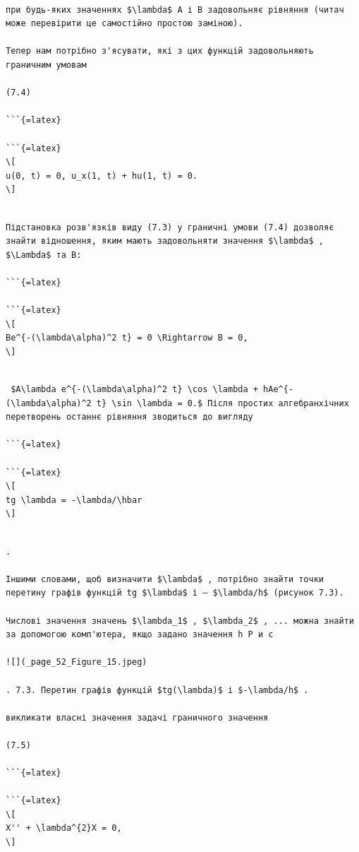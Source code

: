 \documentclass[
]{article}
\begin{document}
\begin{verbatim}

при будь-яких значеннях $\lambda$ A і B задовольняє рівняння (читач може перевірити це самостійно простою заміною).

Тепер нам потрібно з'ясувати, які з цих функцій задовольняють граничним умовам

(7.4)

```{=latex}

```{=latex}
\[
u(0, t) = 0, u_x(1, t) + hu(1, t) = 0.
\]
\end{verbatim}

\begin{verbatim}

Підстановка розв'язків виду (7.3) у граничні умови (7.4) дозволяє знайти відношення, яким мають задовольняти значення $\lambda$ , $\Lambda$ та B:

```{=latex}

```{=latex}
\[
Be^{-(\lambda\alpha)^2 t} = 0 \Rightarrow B = 0,
\]
\end{verbatim}

\begin{verbatim}

 $A\lambda e^{-(\lambda\alpha)^2 t} \cos \lambda + hAe^{-(\lambda\alpha)^2 t} \sin \lambda = 0.$ Після простих алгебранхічних перетворень останнє рівняння зводиться до вигляду

```{=latex}

```{=latex}
\[
tg \lambda = -\lambda/\hbar
\]
\end{verbatim}

\begin{verbatim}

.

Іншими словами, щоб визначити $\lambda$ , потрібно знайти точки перетину графів функцій tg $\lambda$ і — $\lambda/h$ (рисунок 7.3).

Числові значення значень $\lambda_1$ , $\lambda_2$ , ... можна знайти за допомогою комп'ютера, якщо задано значення h Р и с

![](_page_52_Figure_15.jpeg)

. 7.3. Перетин графів функцій $tg(\lambda)$ і $-\lambda/h$ .

викликати власні значення задачі граничного значення

(7.5)

```{=latex}

```{=latex}
\[
X'' + \lambda^{2}X = 0,
\]
\end{verbatim}
\end{document}
